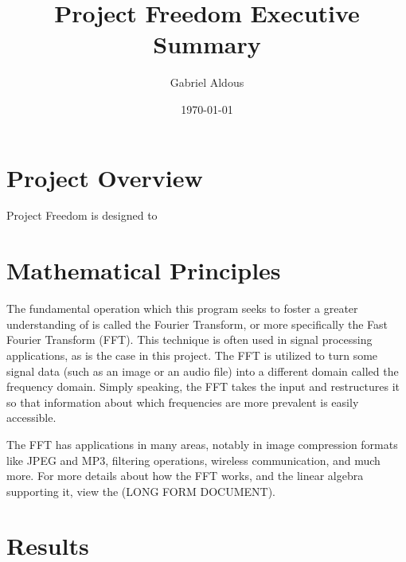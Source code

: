 \documentclass[notitlepage]{article}
\begin{document}

\title{Project Freedom Executive Summary}
\author{Gabriel Aldous}
\date{\isodate\today}

\maketitle

\tableofcontents

\newpage
\section{Project Overview}

Project Freedom is designed to

\section{Mathematical Principles}

The fundamental operation which this program seeks to
foster a greater understanding of is called the Fourier
Transform, or more specifically the Fast Fourier Transform (FFT).
This technique is often used in signal processing applications,
as is the case in this project. The FFT is utilized to turn some
signal data (such as an image or an audio file) into a different domain
called the frequency domain. Simply speaking, the FFT takes the input and
restructures it so that information about which frequencies are more prevalent
is easily accessible.

The FFT has applications in many areas, notably in image compression formats
like JPEG and MP3, filtering operations, wireless communication, and much more.
For more details about how the FFT works, and the linear algebra supporting it,
view the (LONG FORM DOCUMENT).

\section{Results}
\end{document}
